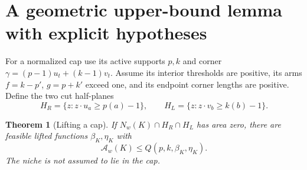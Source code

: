 \documentclass[11pt]{article}
\newtheorem{theorem}{Theorem}[section]
\begin{document}
\section{A geometric upper-bound lemma with explicit hypotheses}
For a normalized cap use its active supports $p,k$ and corner $\gamma=(p-1)u_t+(k-1)v_t$. Assume its interior thresholds are positive, its arms $f=k-p'$, $g=p+k'$ exceed one, and its endpoint corner lengths are positive. Define the two cut half-planes
\[
 H_R=\{z:z\cdot u_a\ge p(a)-1\},\qquad
 H_L=\{z:z\cdot v_b\ge k(b)-1\}.
\]

\begin{theorem}[Lifting a cap]\label{thm:majorant}
If $N_w(K)\cap H_R\cap H_L$ has area zero, there are feasible lifted functions $\beta_K,\eta_K$ with
\[
 \mathcal A_w(K)\le Q(p,k,\beta_K,\eta_K).
\]
The niche is not assumed to lie in the cap.
\end{theorem}
\end{document}
